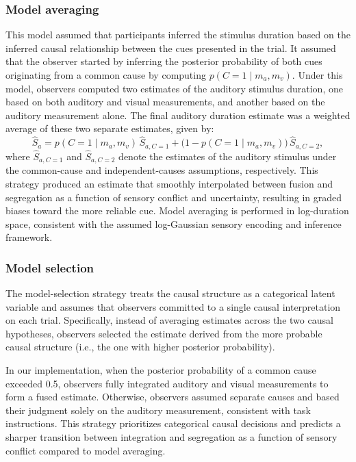 \documentclass[9pt,lineno,doublespacing]{elife}
\begin{document}
\subsubsection{Model averaging}
This model assumed that participants inferred the stimulus duration based on the inferred causal relationship between the cues presented in the trial. It assumed that the observer started by inferring the posterior probability of both cues originating from a common cause by computing $p(C = 1 \mid m_a, m_v)$. Under this model, observers computed two estimates of the auditory stimulus duration, one based on both auditory and visual measurements, and another based on the auditory measurement alone. The final auditory duration estimate was a weighted average of these two separate estimates, given by:
\begin{equation}
\hat S_{a} = p(C=1 \mid m_a,m_v)\,\hat S_{a,C=1} + \bigl(1 - p(C=1 \mid m_a,m_v)\bigr)\, \hat S_{a,C=2},
\label{eq:estimate_model_avg}
\end{equation}
where $\hat S_{a,C=1}$ and $\hat S_{a,C=2}$ denote the estimates of the auditory stimulus under the common-cause and independent-causes assumptions, respectively. This strategy produced an estimate that smoothly interpolated between fusion and segregation as a function of sensory conflict and uncertainty, resulting in graded biases toward the more reliable cue.
Model averaging is performed in log-duration space, consistent with the assumed log-Gaussian sensory encoding and inference framework.

\subsubsection{Model selection}
The model-selection strategy treats the causal structure as a categorical latent variable and assumes that observers committed to a single causal interpretation on each trial. Specifically, instead of averaging estimates across the two causal hypotheses, observers selected the estimate derived from the more probable causal structure (i.e., the one with higher posterior probability).

In our implementation, when the posterior probability of a common cause exceeded 0.5, observers fully integrated auditory and visual measurements to form a fused estimate. Otherwise, observers assumed separate causes and based their judgment solely on the auditory measurement, consistent with task instructions. This strategy prioritizes categorical causal decisions and predicts a sharper transition between integration and segregation as a function of sensory conflict compared to model averaging.
\end{document}

